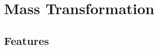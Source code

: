 \section*{%
  Mass Transformation
 }
\begin{multicols}{2}
	
	
	
	
\end{multicols}

\EndTwoColumnLayoutEndMulticolsTwo %
\newpage
\noindent
\begin{specialblock}
	\begin{minipage}[t]{0.375\linewidth}
		\section*{%
		  Features
		 }
		
	\end{minipage}
	\hfill
	\begin{minipage}[t]{0.6\linewidth}
		
	\end{minipage}
\end{specialblock}
\vfill%
\StartTwoColumnLayoutBeginMulticolsTwo%
\setlength{\columnsep}{0.5cm}%
\begin{multicols}{2}
	
	
\end{multicols}
\columnbreak%
\setlength{\columnsep}{0.5cm}%
\begin{multicols}{2}
	
	
\end{multicols}
\EndTwoColumnLayout
\newpage
